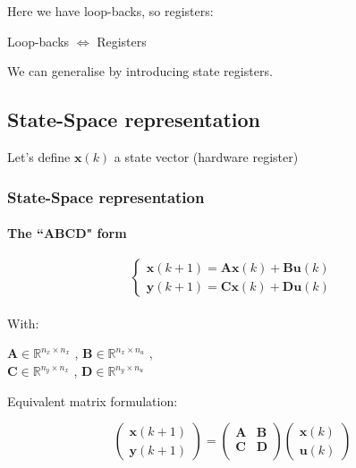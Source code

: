 \begin{frame}
	Here we have loop-backs, so registers:\\
		\begin{center}
	Loop-backs $\iff$ Registers
		\end{center}
	We can generalise by introducing state registers.
\end{frame}

\subsection{State-Space representation}
\begin{frame}
	Let's define $\boldsymbol{x}(k)$ a state vector (hardware register)
	\frametitle{State-Space representation}
	\framesubtitle{The ``ABCD" form}
	\begin{equation} \label{abcddef}
		\begin{cases}
			\boldsymbol{x}(k+1)= \boldsymbol{Ax}(k) + \boldsymbol{Bu}(k) \\
			\boldsymbol{y}(k+1)= \boldsymbol{Cx}(k) + \boldsymbol{Du}(k)
		\end{cases}
	\end{equation}
	\\
	With: \\
		\begin{center}
	$\boldsymbol{A} \in \mathbb{R}^{n_x \times n_x}$ ,
	$\boldsymbol{B} \in \mathbb{R}^{n_x \times n_u}$ , \\
	$\boldsymbol{C} \in \mathbb{R}^{n_y \times n_x}$ ,
	$\boldsymbol{D} \in \mathbb{R}^{n_y \times n_u}$
		\end{center}

	Equivalent matrix formulation:
	
	\begin{equation} \label{abcdef}
		\begin{pmatrix}
			\boldsymbol{x} (k+1)  \\
			\boldsymbol{y} (k+1) 
		\end{pmatrix}
		=
		\begin{pmatrix}
			\boldsymbol{A} & \boldsymbol{B} \\
			\boldsymbol{C} & \boldsymbol{D} \\
		\end{pmatrix}
		\begin{pmatrix}
			\boldsymbol{x} (k)  \\
			\boldsymbol{u} (k) 
		\end{pmatrix}
	\end{equation}

\end{frame}

